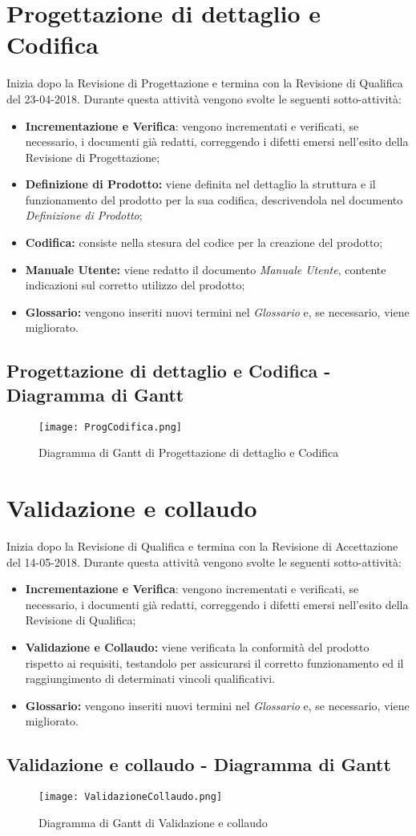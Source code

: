 \documentclass[../PianodiProgetto.tex]{subfiles}
\begin{document}
	\section{Progettazione di dettaglio e Codifica}
	Inizia dopo la Revisione di Progettazione e termina con la Revisione di Qualifica del 23-04-2018. Durante questa attività vengono svolte le seguenti sotto-attività:
	\begin{itemize}
		\item \textbf{Incrementazione e Verifica}: vengono incrementati e verificati, se necessario, i documenti già redatti, correggendo i difetti emersi nell'esito della Revisione di Progettazione;	
		\item \textbf{Definizione di Prodotto:} viene definita nel dettaglio la struttura e il funzionamento del prodotto per la sua codifica, descrivendola nel documento \textit{Definizione di Prodotto};
		\item \textbf{Codifica:} consiste nella stesura del codice per la creazione del prodotto;
		\item \textbf{Manuale Utente:} viene redatto il documento \textit{Manuale Utente}, contente indicazioni sul corretto utilizzo del prodotto; 
		\item \textbf{Glossario:} vengono inseriti nuovi termini nel \textit{Glossario} e, se necessario, viene migliorato.
	\end{itemize}
	\subsection{Progettazione di dettaglio e Codifica - Diagramma di Gantt}
	\begin{figure}[H]
		\texttt{[image: ProgCodifica.png]}	
		\caption{Diagramma di Gantt di Progettazione di dettaglio e Codifica}\label{fig:4}	
	\end{figure}
	
	\section{Validazione e collaudo}
	Inizia dopo la Revisione di Qualifica e termina con la Revisione di Accettazione del 14-05-2018. Durante questa attività vengono svolte le seguenti sotto-attività:
	\begin{itemize}
		\item \textbf{Incrementazione e Verifica}: vengono incrementati e verificati, se necessario, i documenti già redatti, correggendo i difetti emersi nell'esito della Revisione di Qualifica;		
		\item \textbf{Validazione e Collaudo:} viene verificata la conformità del prodotto rispetto ai requisiti, testandolo per assicurarsi il corretto funzionamento ed il raggiungimento di determinati vincoli qualificativi.
		\item \textbf{Glossario:} vengono inseriti nuovi termini nel \textit{Glossario} e, se necessario, viene migliorato.
	\end{itemize}
	\subsection{Validazione e collaudo - Diagramma di Gantt}
	\begin{figure}[H]
		\texttt{[image: ValidazioneCollaudo.png]}	
		\caption{Diagramma di Gantt di Validazione e collaudo}\label{fig:5}	
	\end{figure}
\end{document}
